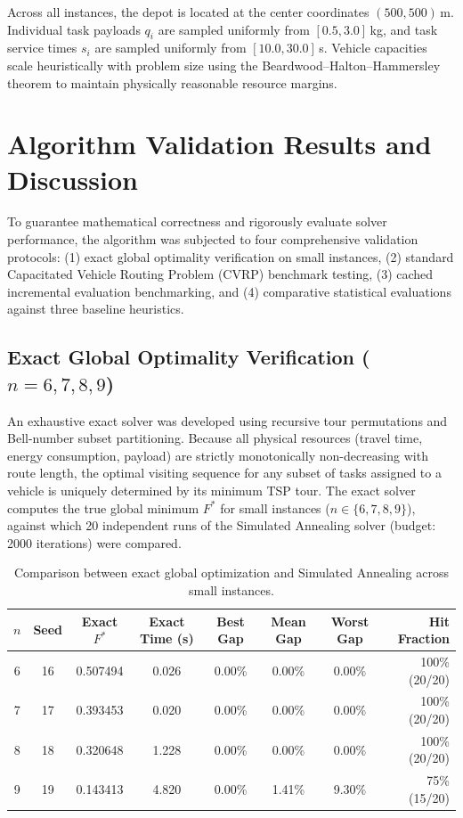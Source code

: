 Across all instances, the depot is located at the center coordinates $(500, 500)$\,m. Individual task payloads $q_i$ are sampled uniformly from $[0.5, 3.0]$\,kg, and task service times $s_i$ are sampled uniformly from $[10.0, 30.0]$\,s. Vehicle capacities scale heuristically with problem size using the Beardwood--Halton--Hammersley theorem \cite{wang} to maintain physically reasonable resource margins.

\section{Algorithm Validation Results and Discussion}\label{sec:validation}
To guarantee mathematical correctness and rigorously evaluate solver performance, the algorithm was subjected to four comprehensive validation protocols: (1) exact global optimality verification on small instances, (2) standard Capacitated Vehicle Routing Problem (\ac{CVRP}) benchmark testing, (3) cached incremental evaluation benchmarking, and (4) comparative statistical evaluations against three baseline heuristics.

\subsection{Exact Global Optimality Verification \texorpdfstring{($n = 6, 7, 8, 9$)}{(n = 6, 7, 8, 9)}}
An exhaustive exact solver was developed using recursive tour permutations and Bell-number subset partitioning. Because all physical resources (travel time, energy consumption, payload) are strictly monotonically non-decreasing with route length, the optimal visiting sequence for any subset of tasks assigned to a vehicle is uniquely determined by its minimum TSP tour. The exact solver computes the true global minimum $F^*$ for small instances ($n \in \{6, 7, 8, 9\}$), against which 20 independent runs of the Simulated Annealing solver (budget: 2000 iterations) were compared.

\begin{table}[htbp]
\centering
\small
\caption{Comparison between exact global optimization and Simulated Annealing across small instances.}
\label{tab:exact_validation}
\begin{tabular}{cccccccr}
\toprule
$n$ & Seed & Exact $F^*$ & Exact Time (s) & Best Gap & Mean Gap & Worst Gap & Hit Fraction \\
\midrule
6 & 16 & 0.507494 & 0.026 & 0.00\% & 0.00\% & 0.00\% & 100\% (20/20) \\
7 & 17 & 0.393453 & 0.020 & 0.00\% & 0.00\% & 0.00\% & 100\% (20/20) \\
8 & 18 & 0.320648 & 1.228 & 0.00\% & 0.00\% & 0.00\% & 100\% (20/20) \\
9 & 19 & 0.143413 & 4.820 & 0.00\% & 1.41\% & 9.30\% & 75\% (15/20) \\
\bottomrule
\end{tabular}
\end{table}

